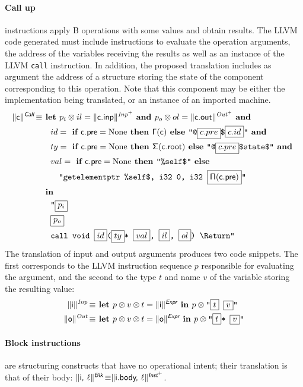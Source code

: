 \documentclass{llncs}
\newcommand{\trad}[2]{\ensuremath{\lVert \textsf{#1} \rVert^{\textit{#2}}}}
\newcommand{\nl}[0]{\text{\Return}}
\DeclareMathOperator{\isdef}{\equiv}
\newcommand{\llvm}[1]{\texttt{#1}}
\newcommand{\B}[1]{\textsf{#1}}
\newcommand{\ListOf}[1]{$\mbox{#1}^+$}
\newcommand{\IF}[0]{\textbf{ if }}
\newcommand{\ELSE}[0]{\textbf{ else }}
\newcommand{\THEN}[0]{\textbf{ then }}
\newcommand{\LET}[0]{\textbf{ let }}
\newcommand{\IN}[0]{\textbf{ in }}
\newcommand{\AND}[0]{\textbf{ and }}
\newcommand{\PH}[1]{\framebox{$#1$}}
\newcommand{\sep}[0]{\otimes}
\newcommand{\Global}[0]{\ensuremath{\sf\Gamma}}
\newcommand{\idx}[0]{\ensuremath{\sf\Pi}}
\newcommand{\state}[0]{\ensuremath{\sf\Sigma}}
\begin{document}
\paragraph{Call up} instructions apply B operations with some values and obtain
results. The LLVM code generated must include instructions to evaluate the
operation arguments, the address of the variables receiving the results as well
as an instance of the LLVM \llvm{call} instruction. In addition, the proposed
translation includes as argument the address of a structure storing the state of
the component corresponding to this operation. Note that this component may be
either the implementation being translated, or an instance of an imported
machine.
\begin{align*}
  \trad{c}{\B{Call}} \isdef 
  & \LET p_i \sep il = \trad{c.inp}{\ListOf{Inp}} \AND p_o \sep ol = 
  \trad{c.out}{\ListOf{Out}} \AND \\
  & \quad id = \IF \B{c.pre} = \text{None} \THEN \Global(\B{c}) \ELSE \llvm{"@\PH{c.pre}\$\PH{c.id}"} \AND \\
  & \quad ty = \IF \B{c.pre} = \text{None} \THEN \state(\B{c.root}) \ELSE \llvm{"@\PH{c.pre}\$state\$"} \AND \\
  & \quad val = \IF \B{c.pre} = \text{None} \THEN \llvm{"\%self\$"} \ELSE \\
  & \quad \quad \llvm{"getelementptr \%self\$, i32 0, i32 \PH{\idx(\B{c.pre})}"}\\
  & \IN \\
  & \quad \llvm{"\PH{p_i}} \\
  & \quad \llvm{\PH{p_o}} \\
  & \quad \llvm{call void \PH{id}(\PH{ty}* \PH{val}, \PH{il}, \PH{ol}) \nl"}
\end{align*}
The translation of input and output arguments produces two code snippets. The
first corresponds to the LLVM instruction sequence $p$ responsible for
evaluating the argument, and the second to the type $t$ and name $v$ of the
variable storing the resulting value:
\begin{align*}
  \trad{i}{Inp} \isdef 
  & \LET p \sep v \sep t = \trad{i}{\B{Expr}} \IN p \sep \llvm{"\PH{t} \PH{v}"}\\
  \trad{o}{Out} \isdef 
  & \LET p \sep v \sep t = \trad{o}{\B{Expr}} \IN p \sep \llvm{"\PH{t}* \PH{v}"}
\end{align*}

\paragraph{Block instructions} are structuring constructs that have no
operational intent; their translation is that of their body: $\trad{i,
  $\ell$}{\B{Blk}} \isdef \trad{i.body, $\ell$}{\ListOf{\B{Inst}}}$.
\end{document}
